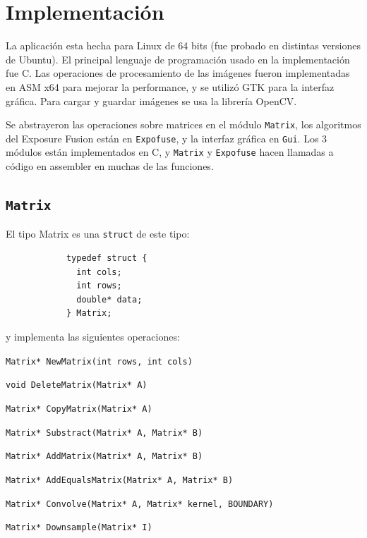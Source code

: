 \documentclass[a4paper,10pt]{article}
\begin{document}
    \section{Implementación}

        La aplicación esta hecha para Linux de 64 bits (fue probado en distintas versiones de Ubuntu). El principal lenguaje de programación usado en la implementación fue C. Las operaciones de procesamiento de las imágenes fueron implementadas en ASM x64 para mejorar la performance, y se utilizó GTK para la interfaz gráfica. Para cargar y guardar imágenes se usa la librería OpenCV.
        
        Se abstrayeron las operaciones sobre matrices en el módulo \texttt{Matrix}, los algoritmos del Exposure Fusion están en \texttt{Expofuse}, y la interfaz gráfica en \texttt{Gui}. Los 3 módulos están implementados en C, y \texttt{Matrix} y \texttt{Expofuse} hacen llamadas a código en assembler en muchas de las funciones.
        
        \subsection{\texttt{Matrix}}
            El tipo Matrix es una \texttt{struct} de este tipo:
            
            \begin{verbatim}
            typedef struct {
              int cols;
              int rows;
              double* data;
            } Matrix;\end{verbatim}

            y implementa las siguientes operaciones:
            
            \texttt{Matrix* NewMatrix(int rows, int cols)}
            
            \texttt{void DeleteMatrix(Matrix* A)}
            
            \texttt{Matrix* CopyMatrix(Matrix* A)}
            
            \texttt{Matrix* Substract(Matrix* A, Matrix* B)}
            
            \texttt{Matrix* AddMatrix(Matrix* A, Matrix* B)}
            
            \texttt{Matrix* AddEqualsMatrix(Matrix* A, Matrix* B)}
            
            \texttt{Matrix* Convolve(Matrix* A, Matrix* kernel, BOUNDARY)}
            
            \texttt{Matrix* Downsample(Matrix* I)}
            
\end{document}
